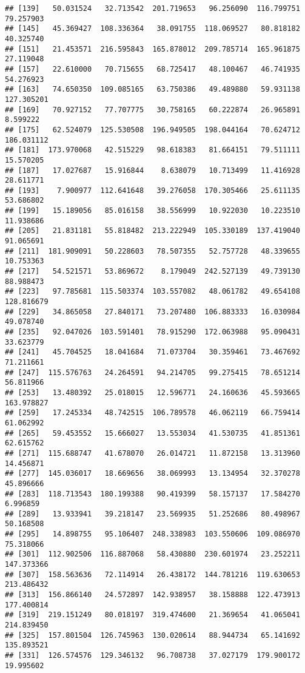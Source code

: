 \documentclass[
]{article}
\begin{document}
\begin{verbatim}
## [139]   50.031524   32.713542  201.719653   96.256090  116.799751   79.257903
## [145]   45.369427  108.336364   38.091755  118.069527   80.818182   40.325740
## [151]   21.453571  216.595843  165.878012  209.785714  165.961875   27.119048
## [157]   22.610000   70.715655   68.725417   48.100467   46.741935   54.276923
## [163]   74.650350  109.085165   63.750386   49.489880   59.931138  127.305201
## [169]   70.927152   77.707775   30.758165   60.222874   26.965891    8.599222
## [175]   62.524079  125.530508  196.949505  198.044164   70.624712  186.031112
## [181]  173.970068   42.515229   98.618383   81.664151   79.511111   15.570205
## [187]   17.027687   15.916844    8.638079   10.713499   11.416928   28.611771
## [193]    7.900977  112.641648   39.276058  170.305466   25.611135   53.686802
## [199]   15.189056   85.016158   38.556999   10.922030   10.223510   11.938686
## [205]   21.831181   55.818482  213.222949  105.330189  137.419040   91.065691
## [211]  181.909091   50.228603   78.507355   52.757728   48.339655   10.753363
## [217]   54.521571   53.869672    8.179049  242.527139   49.739130   88.988473
## [223]   97.785681  115.503374  103.557082   48.061782   49.654108  128.816679
## [229]   34.865058   27.840171   73.207480  106.883333   16.030984   49.078740
## [235]   92.047026  103.591401   78.915290  172.063988   95.090431   33.623779
## [241]   45.704525   18.041684   71.073704   30.359461   73.467692   71.211661
## [247]  115.576763   24.264591   94.214705   99.275415   78.651214   56.811966
## [253]   13.480392   25.018015   12.596771   24.160636   45.593665  163.978827
## [259]   17.245334   48.742515  106.789578   46.062119   66.759414   61.062992
## [265]   59.453552   15.666027   13.553034   41.530735   41.851361   62.615762
## [271]  115.688747   41.678070   26.014721   11.872158   13.313960   14.456871
## [277]  145.036017   18.669656   38.069993   13.134954   32.370278   45.896666
## [283]  118.713543  180.199388   90.419399   58.157137   17.584270    6.996859
## [289]   13.933941   39.218147   23.569935   51.252686   80.498967   50.168508
## [295]   14.898755   95.106407  248.338983  103.550606  109.086970   75.318066
## [301]  112.902506  116.887068   58.430880  230.601974   23.252211  147.373366
## [307]  158.563636   72.114914   26.438172  144.781216  119.630653  213.486432
## [313]  156.866140   24.572897  142.938957   38.158888  122.473913  177.400814
## [319]  219.151249   80.018197  319.474600   21.369654   41.065041  214.839450
## [325]  157.801504  126.745963  130.020614   88.944734   65.141692  135.893521
## [331]  126.574576  129.346132   96.708738   37.027179  179.900172   19.995602

\end{verbatim}
\end{document}
